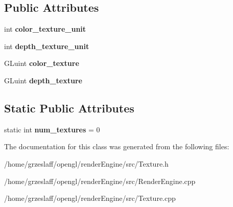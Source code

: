 \subsection*{Public Attributes}
\begin{DoxyCompactItemize}
\item 
\hypertarget{classTexture_a3fee23d831df8363edf046d02074f00e}{int {\bfseries color\-\_\-texture\-\_\-unit}}\label{classTexture_a3fee23d831df8363edf046d02074f00e}

\item 
\hypertarget{classTexture_af3e9294010fb381acc3c6c270a669d38}{int {\bfseries depth\-\_\-texture\-\_\-unit}}\label{classTexture_af3e9294010fb381acc3c6c270a669d38}

\item 
\hypertarget{classTexture_a416659ef2cac437b9960ca4af5045e12}{G\-Luint {\bfseries color\-\_\-texture}}\label{classTexture_a416659ef2cac437b9960ca4af5045e12}

\item 
\hypertarget{classTexture_a040fe3c2e1d7bc825e61efde7fe24ae5}{G\-Luint {\bfseries depth\-\_\-texture}}\label{classTexture_a040fe3c2e1d7bc825e61efde7fe24ae5}

\end{DoxyCompactItemize}
\subsection*{Static Public Attributes}
\begin{DoxyCompactItemize}
\item 
\hypertarget{classTexture_a1049167593ab377e32180ce820a7cc06}{static int {\bfseries num\-\_\-textures} = 0}\label{classTexture_a1049167593ab377e32180ce820a7cc06}

\end{DoxyCompactItemize}


The documentation for this class was generated from the following files\-:\begin{DoxyCompactItemize}
\item 
/home/grzeslaff/opengl/render\-Engine/src/Texture.\-h\item 
/home/grzeslaff/opengl/render\-Engine/src/Render\-Engine.\-cpp\item 
/home/grzeslaff/opengl/render\-Engine/src/Texture.\-cpp\end{DoxyCompactItemize}
